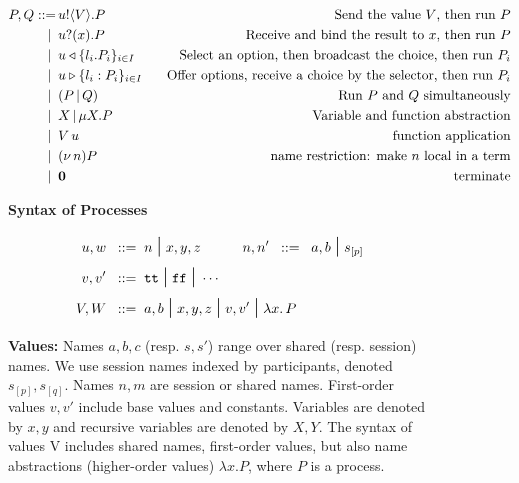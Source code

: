 \documentclass[runningheads,plain]{llncs}
\begin{document}
\begin{figure}[h!]
\begin{align*}
P, Q ::= \, 
        & u ! \langle V \rangle .{P} \,\,\, \, \, &\text{Send the value }V\text{, then run }P \\
|\,\,\, & u ? (x) .{P} \,\,\, \, \, & \text{Receive and bind the result to }x\text{, then run }P \\
|\,\,\, &  u \triangleleft \{l_i. P_i\}_{i\in I}\,\,\, \, \, & \text{Select an option, then broadcast the choice, then run }P_i \\
|\,\,\, & u \triangleright \{l_i:P_i\}_{i \in I} \,\,\, \, \, & \text{Offer options, receive a choice by the selector, then run } P_i \\
|\,\,\, & (P\,|\,Q) \,\,\, \, \, \, \, \, \, &\text{Run }P\text{ and }Q\text{ simultaneously} \\
|\,\,\, & X \,|\, \mu X. P \,\,\, &\text{Variable and function abstraction}\\
|\,\,\, & V\, {u} \,\,\, &\text{function application} \\
|\,\,\, & (\nu\, n)P \,\,\, &\text{name restriction: make $n$ local in a term} \\
|\,\,\, & \mathbf{0} \,\,\, &\text{terminate} \\
\end{align*}
\caption{\textbf{Syntax of Processes}}
\label{fig:process-syntax}
\end{figure}

\begin{figure}
\begin{align*}
u,w  \;\;::=\;\;& n \;\mbox{\Large{$\mid$}}\; x,y,z
\qquad \quad
n,n' \;\;::=\;\; a,b \;\mbox{\Large{$\mid$}}\; s_{[p]}
\\
 {v},  {v}'  \;\;::=\;\; &  \mathtt{tt} \;\mbox{\Large{$\mid$}}\; \mathtt{ff} \;\mbox{\Large{$\mid$}}\; \cdots
\\
V,W \;\;::=\;\; & {a,b} \;\mbox{\Large{$\mid$}}\;  x,y,z \;\mbox{\Large{$\mid$}}\;  v, v' \;\mbox{\Large{$\mid$}}\; {\lambda x.\,P}
\end{align*}
\caption{\textbf{Values:}
Names $a,b,c$ (resp. $s,s'$) range over shared (resp. session) names.
We use session names indexed by participants, denoted $s_{[p]},s_{[q]}$.
Names $n,m$ are session or shared names. First-order values $v,v'$ 
include base values and constants. Variables are denoted by $x,y$ and
recursive variables are denoted by $X,Y$. The syntax of values V includes shared names, 
first-order values, but also name abstractions
(higher-order values) $\lambda x. P$, where $P$ is a process.
}
\end{figure}
\end{document}
